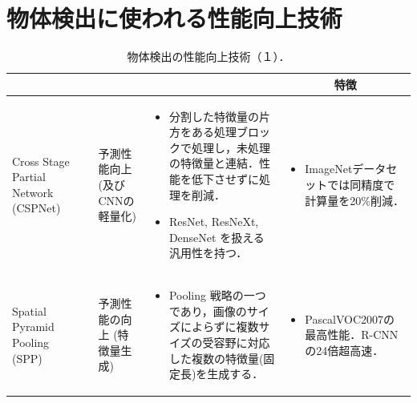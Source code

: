 \documentclass[twocolumn]{jsarticle} %
\begin{document}
\section{物体検出に使われる性能向上技術}
\begin{table}
    \caption{物体検出の性能向上技術（１）．}
    \label{tbl-option1}
    \begin{center}
        \setlength{\tabcolsep}{3pt}
        \footnotesize
        \begin{tabularx}{\linewidth}{Xp{1.5cm}Xp{7cm}X} \toprule
            \centering{技術名称} & \centering{文献} & \centering{用途} & \centering{概要} & \multicolumn{1}{c}{特徴} \\ \midrule

            Cross Stage Partial Network (CSPNet) 
            & \cite{WLWCHY20} & 予測性能向上 (及びCNNの軽量化) & 
            \begin{itemize}
                \vspace{-0.7\baselineskip}
                \setlength{\leftskip}{-3mm}
                \item 分割した特徴量の片方をある処理ブロックで処理し，未処理の特徴量と連結．性能を低下させずに処理を削減．
                \item ResNet, ResNeXt, DenseNet を扱える汎用性を持つ．
            \end{itemize}
            &
            \begin{itemize}
                \vspace{-0.7\baselineskip}
                \setlength{\leftskip}{-3mm}
                \item ImageNetデータセットでは同精度で計算量を20\%削減．
            \end{itemize}
            \\

            Spatial Pyramid Pooling (SPP)
            & \cite{HZRS15,HZRS14} & 予測性能の向上 (特徴量生成) & 
            \begin{itemize}
                \vspace{-0.7\baselineskip}
                \setlength{\leftskip}{-3mm}
                \item Pooling 戦略の一つであり，画像のサイズによらずに複数サイズの受容野に対応した複数の特徴量(固定長)を生成する．
            \end{itemize}
            &
            \begin{itemize}
                \vspace{-0.7\baselineskip}
                \setlength{\leftskip}{-3mm}
                \item PascalVOC2007の最高性能．R-CNNの24倍超高速．
            \end{itemize}
            \\


\end{tabularx}
\end{center}
\end{table}
\end{document}
